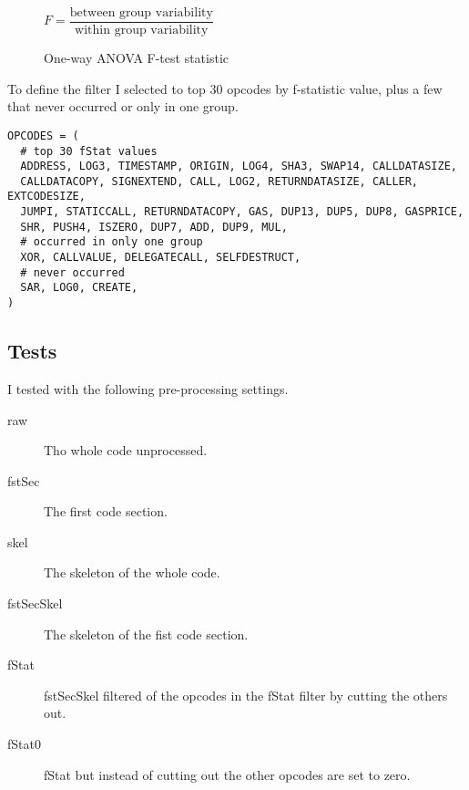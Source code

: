 \documentclass[../main.tex]{subfiles}
\begin{document}
\begin{figure*}[ht!]
  \centering
  \begin{math}
    F = \dfrac{\textrm{between group variability}}{\textrm{within group variability}}
  \end{math}
  \caption{One-way ANOVA F-test statistic}
  \label{fig:ftest}
\end{figure*}

To define the  filter I selected to top 30 opcodes by f-statistic value, plus a few that never occurred or only in one group.

\begin{lstlisting}[style=pymd]
OPCODES = (
  # top 30 fStat values
  ADDRESS, LOG3, TIMESTAMP, ORIGIN, LOG4, SHA3, SWAP14, CALLDATASIZE,
  CALLDATACOPY, SIGNEXTEND, CALL, LOG2, RETURNDATASIZE, CALLER, EXTCODESIZE,
  JUMPI, STATICCALL, RETURNDATACOPY, GAS, DUP13, DUP5, DUP8, GASPRICE,
  SHR, PUSH4, ISZERO, DUP7, ADD, DUP9, MUL,
  # occurred in only one group
  XOR, CALLVALUE, DELEGATECALL, SELFDESTRUCT,
  # never occurred
  SAR, LOG0, CREATE,
)
\end{lstlisting}

\subsection{Tests}
I tested with the following pre-processing settings.

\begin{description}
  \item[raw] Tho whole code unprocessed.
  \item[fstSec] The first code section.
  \item[skel] The skeleton of the whole code.
  \item[fstSecSkel] The skeleton of the fist code section.
  \item[fStat] fstSecSkel filtered of the opcodes in the fStat filter by cutting the others out.
  \item[fStat0] fStat but instead of cutting out the other opcodes are set to zero.
\end{description}
\end{document}
